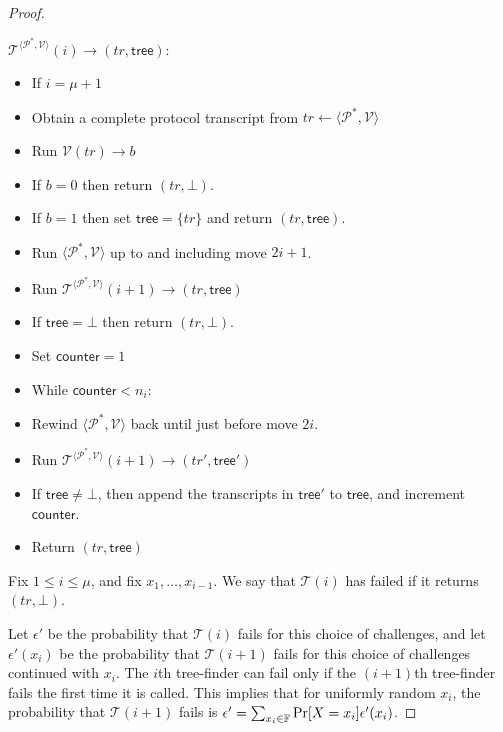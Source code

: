 \begin{proof}
\begin{description}
\item $\mathcal{T}^{\langle \mathcal{P}^*, \mathcal{V}\rangle}(i) \to (tr,\mathsf{tree})$:
\begin{itemize}
\item If $i = \mu+1$
\item \qquad Obtain a complete protocol transcript from $tr \gets \langle \mathcal{P}^*, \mathcal{V}\rangle$
\item \qquad Run $\mathcal{V}(tr) \to b$
\item \qquad If $b=0$ then return $(tr,\bot)$.
\item \qquad If $b=1$ then set $\mathsf{tree} = \{tr\}$ and return $(tr,\mathsf{tree})$.
\item Run $\langle \mathcal{P}^*, \mathcal{V}\rangle$ up to and including move $2i+1$.
\item Run $\mathcal{T}^{\langle \mathcal{P}^*, \mathcal{V}\rangle}(i+1) \to (tr,\mathsf{tree})$
\item If $\mathsf{tree}=\bot$ then return $(tr,\bot)$.

\item Set $\mathsf{counter}=1$
\item While $\mathsf{counter}< n_{i}$:
\item \qquad Rewind $\langle \mathcal{P}^*, \mathcal{V}\rangle$ back until just before move $2i$.
\item \qquad Run $\mathcal{T}^{\langle \mathcal{P}^*, \mathcal{V}\rangle}(i+1) \to (tr',\mathsf{tree}')$
\item \qquad If $\mathsf{tree} \neq \bot$, then append the transcripts in $\mathsf{tree}'$ to $\mathsf{tree}$, and increment $\mathsf{counter}$.

\item Return $(tr,\mathsf{tree})$

\end{itemize}
\end{description}

Fix $1 \leq i \leq \mu$, and fix $x_1,\ldots,x_{i-1}$. We say that $\mathcal{T}(i)$ has failed if it returns $(tr,\bot)$.

Let $\epsilon'$ be the probability that $\mathcal{T}(i)$ fails for this choice of challenges, and let $\epsilon'(x_i)$ be the probability that $\mathcal{T}(i+1)$ fails for this choice of challenges continued with $x_i$. The $i$th tree-finder can fail only if the $(i+1)$th tree-finder fails the first time it is called. This implies that for uniformly random $x_i$, the probability that $\mathcal{T}(i+1)$ fails is $\epsilon' = \sum_{x_i \in \mathbb{F}} \Pr[X=x_i] \epsilon'(x_i)$.


\end{proof}
